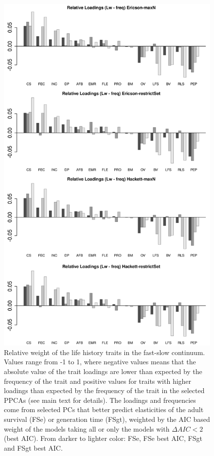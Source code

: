 \begin{figure}[ht!]
\centering
\includegraphics[width=.8\textwidth]{./Figures/Appendix2_1/FS relWeights plots-ALL.png}
\caption[LHT relative importance of the FS axes]{
Relative weight of the life history traits in the fast-slow continuum. Values
range from -1 to 1, where negative values means that the absolute value of the
trait loadings are lower than expected by the frequency of the trait and
positive values for traits with higher loadings than expected by the frequency
of the trait in the selected PPCAs (see main text for details). The loadings and
frequencies come from selected PCs that better predict elasticities of the
adult survival (FSe) or generation time (FSgt), weighted by the AIC based weight
of the models taking all or only the models with $\Delta AIC < 2$ (best AIC).
From darker to lighter color: FSe, FSe best AIC, FSgt and FSgt best AIC.}
\label{fig:figApp2.2}
\end{figure}

